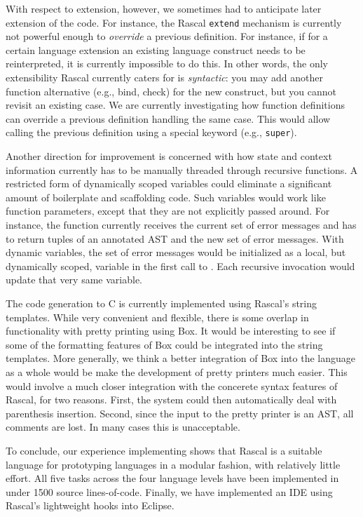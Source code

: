 With respect to extension, however, we sometimes had to anticipate later extension of the code.  For instance, the Rascal \texttt{extend} mechanism is currently not powerful enough to \textit{override} a previous definition. For instance, if for a certain language extension an existing language construct needs to be reinterpreted, it is currently impossible to do this. In other words, the only extensibility Rascal currently caters for is \textit{syntactic}: you may add another function alternative (e.g., bind, check) for the new construct, but you cannot revisit an existing case. We are currently investigating how function definitions can override a previous definition handling the same case. This would allow calling the previous definition using a special keyword (e.g., \texttt{super}).

Another direction for improvement is concerned with how state and context information currently has to be manually threaded through recursive functions. A restricted form of dynamically scoped variables could eliminate a significant amount of boilerplate and scaffolding code. Such variables would work like function parameters, except that they are not explicitly passed around. For instance, the  function currently receives the current set of error messages and has to return tuples of an annotated AST and the new set of error messages. With dynamic variables, the set of error messages would be initialized as a local, but dynamically scoped, variable in the first call to . Each recursive invocation  would update that very same variable.

The code generation to C is currently implemented using Rascal's string templates. While very convenient and flexible, there is some overlap in functionality with pretty printing using Box. It would be interesting to see if some of the formatting features of Box could be integrated into the string templates. More generally, we think a better integration of Box into the language as a whole would be make the development of pretty printers much easier. This would involve a much closer integration with the concerete syntax features of Rascal, for two reasons. First, the system could then automatically deal with parenthesis insertion. Second, since the input to the pretty printer is an AST, all comments are lost. In many cases this is unacceptable.

To conclude, our experience implementing \oberon shows that Rascal is a suitable language for prototyping languages in a modular fashion, with relatively little effort. All five tasks across the four language levels have been implemented in under 1500 source lines-of-code. Finally, we have implemented an \oberon IDE using Rascal's lightweight hooks into Eclipse. 

